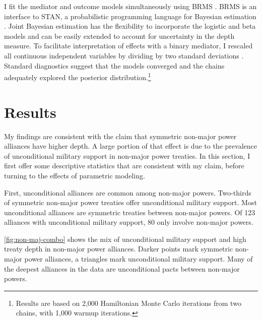 \documentclass[12pt]{article}
\begin{document}
I fit the mediator and outcome models simultaneously using BRMS \citep{Buerkner2017}. 
BRMS is an interface to STAN, a probabilistic programming language for Bayesian estimation \citep{Carpenteretal2016}.
Joint Bayesian estimation has the flexibility to incorporate the logistic and beta models and can be easily extended to account for uncertainty in the depth measure. 
To facilitate interpretation of effects with a binary mediator, I rescaled all continuous independent variables by dividing by two standard deviations \citep{Gelman2008}. 
Standard diagnostics suggest that the models converged and the chains adequately explored the posterior distribution.\footnote{Results are based on 2,000 Hamiltonian Monte Carlo iterations from two chains, with 1,000 warmup iterations.} 


\section{Results}

My findings are consistent with the claim that symmetric non-major power alliances have higher depth. 
A large portion of that effect is due to the prevalence of unconditional military support in non-major power treaties. 
In this section, I first offer some descriptive statistics that are consistent with my claim, before turning to the effects of parametric modeling. 


First, unconditional alliances are common among non-major powers. 
Two-thirds of symmetric non-major power treaties offer unconditional military support. 
Most unconditional alliances are symmetric treaties between non-major powers. 
Of 123 alliances with unconditional military support, 80 only involve non-major powers. 


\autoref{fig:non-maj-combo} shows the mix of unconditional military support and high treaty depth in non-major power alliances. 
Darker points mark symmetric non-major power alliances, a triangles mark unconditional military support. 
Many of the deepest alliances in the data are unconditional pacts between non-major powers. 
\end{document}
